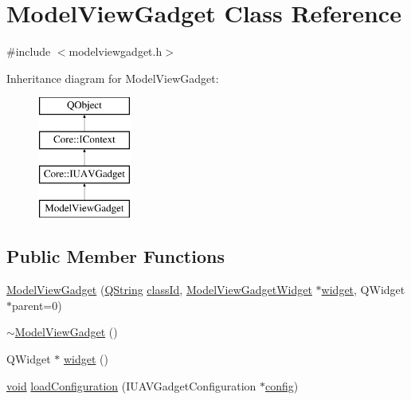 \hypertarget{class_model_view_gadget}{\section{Model\-View\-Gadget Class Reference}
\label{class_model_view_gadget}
}


{\ttfamily \#include $<$modelviewgadget.\-h$>$}

Inheritance diagram for Model\-View\-Gadget\-:\begin{figure}[H]
\begin{center}
\leavevmode
\includegraphics[height=4.000000cm]{class_model_view_gadget}
\end{center}
\end{figure}
\subsection*{Public Member Functions}
\begin{DoxyCompactItemize}
\item 
\hyperlink{group___model_view_plugin_ga411c180daebc524f226c60cef529bcd4}{Model\-View\-Gadget} (\hyperlink{group___u_a_v_objects_plugin_gab9d252f49c333c94a72f97ce3105a32d}{Q\-String} \hyperlink{group___core_plugin_ga3878fde66a57220608960bcc3fbeef2c}{class\-Id}, \hyperlink{class_model_view_gadget_widget}{Model\-View\-Gadget\-Widget} $\ast$\hyperlink{group___model_view_plugin_ga9240ecd7243b93f3188923a7a28926b1}{widget}, Q\-Widget $\ast$parent=0)
\item 
\hyperlink{group___model_view_plugin_ga0b914fe76448332e8f22649b75984f4d}{$\sim$\-Model\-View\-Gadget} ()
\item 
Q\-Widget $\ast$ \hyperlink{group___model_view_plugin_ga9240ecd7243b93f3188923a7a28926b1}{widget} ()
\item 
\hyperlink{group___u_a_v_objects_plugin_ga444cf2ff3f0ecbe028adce838d373f5c}{void} \hyperlink{group___model_view_plugin_gae2075c43d77a6afba12fa43cbda0af36}{load\-Configuration} (I\-U\-A\-V\-Gadget\-Configuration $\ast$\hyperlink{deflate_8c_a4473b5227787415097004fd39f55185e}{config})
\end{DoxyCompactItemize}
